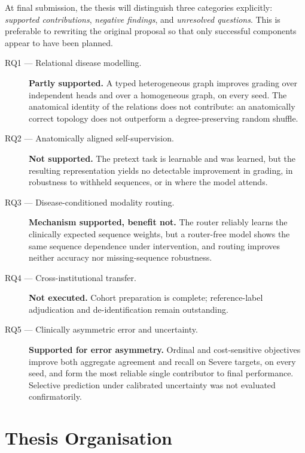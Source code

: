 At final submission, the thesis will distinguish three categories explicitly:
\emph{supported contributions}, \emph{negative findings}, and \emph{unresolved
questions}. This is preferable to rewriting the original proposal so that only
successful components appear to have been planned.

\begin{description}
  \item[RQ1 --- Relational disease modelling.] \textbf{Partly supported.} A typed
  heterogeneous graph improves grading over independent heads and over a
  homogeneous graph, on every seed. The anatomical identity of the relations does
  not contribute: an anatomically correct topology does not outperform a
  degree-preserving random shuffle.

  \item[RQ2 --- Anatomically aligned self-supervision.] \textbf{Not supported.}
  The pretext task is learnable and was learned, but the resulting representation
  yields no detectable improvement in grading, in robustness to withheld
  sequences, or in where the model attends.

  \item[RQ3 --- Disease-conditioned modality routing.] \textbf{Mechanism
  supported, benefit not.} The router reliably learns the clinically expected
  sequence weights, but a router-free model shows the same sequence dependence
  under intervention, and routing improves neither accuracy nor missing-sequence
  robustness.

  \item[RQ4 --- Cross-institutional transfer.] \textbf{Not executed.} Cohort
  preparation is complete; reference-label adjudication and de-identification
  remain outstanding.

  \item[RQ5 --- Clinically asymmetric error and uncertainty.] \textbf{Supported
  for error asymmetry.} Ordinal and cost-sensitive objectives improve both
  aggregate agreement and recall on Severe targets, on every seed, and form the
  most reliable single contributor to final performance. Selective prediction
  under calibrated uncertainty was not evaluated confirmatorily.
\end{description}

\section{Thesis Organisation}
\label{sec:intro-organisation}

